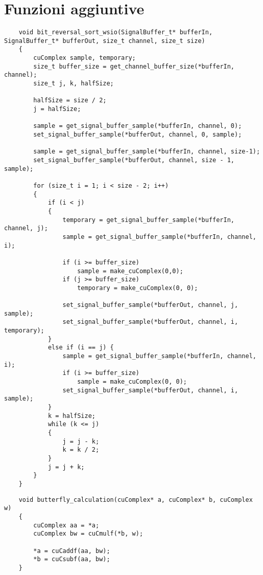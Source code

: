 \chapter{Funzioni aggiuntive}
\begin{lstlisting}
    void bit_reversal_sort_wsio(SignalBuffer_t* bufferIn, SignalBuffer_t* bufferOut, size_t channel, size_t size)
    {
        cuComplex sample, temporary;
        size_t buffer_size = get_channel_buffer_size(*bufferIn, channel);
        size_t j, k, halfSize;
    
        halfSize = size / 2;
        j = halfSize;
    
        sample = get_signal_buffer_sample(*bufferIn, channel, 0);
        set_signal_buffer_sample(*bufferOut, channel, 0, sample);
    
        sample = get_signal_buffer_sample(*bufferIn, channel, size-1);
        set_signal_buffer_sample(*bufferOut, channel, size - 1, sample);
    
        for (size_t i = 1; i < size - 2; i++)
        {
            if (i < j)
            {
                temporary = get_signal_buffer_sample(*bufferIn, channel, j);
                sample = get_signal_buffer_sample(*bufferIn, channel, i);
    
                if (i >= buffer_size)
                    sample = make_cuComplex(0,0);
                if (j >= buffer_size)
                    temporary = make_cuComplex(0, 0);
    
                set_signal_buffer_sample(*bufferOut, channel, j, sample);
                set_signal_buffer_sample(*bufferOut, channel, i, temporary);
            }
            else if (i == j) {
                sample = get_signal_buffer_sample(*bufferIn, channel, i);
                if (i >= buffer_size)
                    sample = make_cuComplex(0, 0);
                set_signal_buffer_sample(*bufferOut, channel, i, sample);
            }
            k = halfSize;
            while (k <= j)
            {
                j = j - k;
                k = k / 2;
            }
            j = j + k;
        }
    }
\end{lstlisting}

\begin{lstlisting}
    void butterfly_calculation(cuComplex* a, cuComplex* b, cuComplex w)
    {
        cuComplex aa = *a;
        cuComplex bw = cuCmulf(*b, w);
    
        *a = cuCaddf(aa, bw);
        *b = cuCsubf(aa, bw);
    }    
\end{lstlisting}